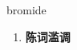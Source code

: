 
\begin{frame}
{\huge bromide}
\begin{center}
\begin{enumerate}\Large
  \item \textbf{陈词滥调}
\end{enumerate}
\end{center}
\end{frame}
